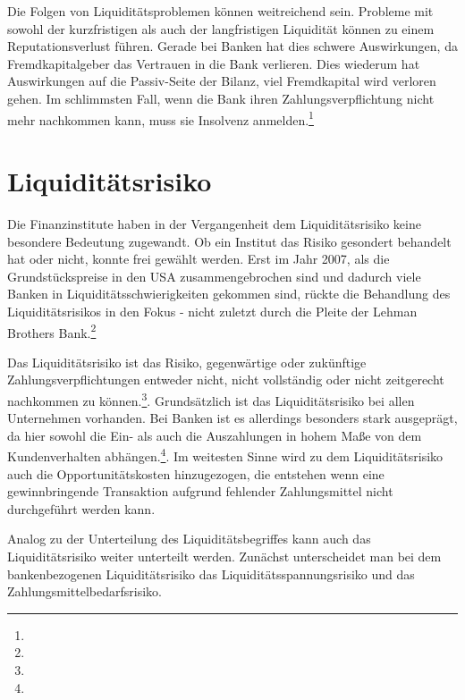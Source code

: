 \begin{onehalfspacing}
Die Folgen von Liquiditätsproblemen können weitreichend sein. Probleme mit sowohl der kurzfristigen als auch der langfristigen Liquidität können zu einem Reputationsverlust führen. Gerade bei Banken hat dies schwere Auswirkungen, da Fremdkapitalgeber das Vertrauen in die Bank verlieren. Dies wiederum hat Auswirkungen auf die Passiv-Seite der Bilanz, viel Fremdkapital wird verloren gehen. Im schlimmsten Fall, wenn die Bank ihren Zahlungsverpflichtung nicht mehr nachkommen kann, muss sie Insolvenz anmelden.\footnote{ }

\section{Liquiditätsrisiko}
Die Finanzinstitute haben in der Vergangenheit dem Liquiditätsrisiko keine besondere Bedeutung zugewandt. Ob ein Institut das Risiko gesondert behandelt hat oder nicht, konnte frei gewählt werden. Erst im Jahr 2007, als die Grundstückspreise in den USA zusammengebrochen sind und dadurch viele Banken in Liquiditätsschwierigkeiten gekommen sind, rückte die Behandlung des Liquiditätsrisikos in den Fokus - nicht zuletzt durch die Pleite der Lehman Brothers Bank.\footnote{ }


Das Liquiditätsrisiko ist das Risiko, gegenwärtige oder zukünftige Zahlungsverpflichtungen entweder nicht, nicht vollständig oder nicht zeitgerecht nachkommen zu können.\footnote{  }. Grundsätzlich ist das Liquiditätsrisiko bei allen Unternehmen vorhanden. Bei Banken ist es allerdings besonders stark ausgeprägt, da hier sowohl die Ein- als auch die Auszahlungen in hohem Maße von dem Kundenverhalten abhängen.\footnote{ }. Im weitesten Sinne wird zu dem Liquiditätsrisiko auch die Opportunitätskosten hinzugezogen, die entstehen wenn eine gewinnbringende Transaktion aufgrund fehlender Zahlungsmittel nicht durchgeführt werden kann.

Analog zu der Unterteilung des Liquiditätsbegriffes kann auch das Liquiditätsrisiko weiter unterteilt werden. Zunächst unterscheidet man bei dem bankenbezogenen Liquiditätsrisiko das Liquiditätsspannungsrisiko und das Zahlungsmittelbedarfsrisiko.


\end{onehalfspacing}

